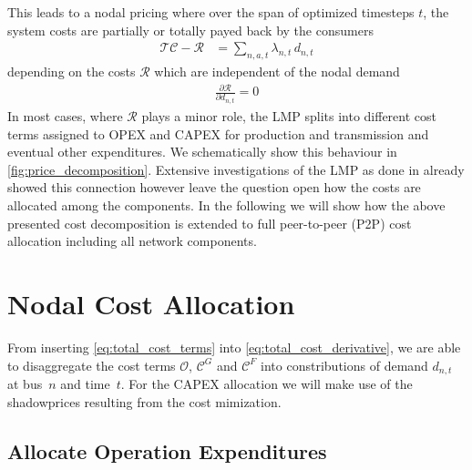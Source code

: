 \documentclass[11pt,twocolumn]{article}
\newcommand{\pdv}[2]{\frac{\partial #1}{\partial #2}}
\newcommand{\demand}[1][n]{d_{#1,t}}
\newcommand{\lmp}[1][n]{\lambda_{#1,t}}
\newcommand{\totalcost}{\mathcal{TC}}
\newcommand{\totalOpexGeneration}{\mathcal{O}}
\newcommand{\totalCapexGeneration}{\mathcal{C}^G}
\newcommand{\totalCapexFlow}{\mathcal{C}^F}
\newcommand{\totalRest}{\mathcal{R}}
\begin{document}
This leads to a nodal pricing where over the span of optimized timesteps $t$, the system costs are partially or totally payed back by the consumers 
\begin{align}
\totalcost - \totalRest &=  \sum_{n,a,t} \lmp \, \demand
\label{eq:total_cost_sum}
\end{align}
depending on the costs $\totalRest$ which are independent of the nodal demand  
\begin{align}
 \pdv{\totalRest}{\demand} = 0
\end{align}
% 
In most cases, where $\totalRest$ plays a minor role, the LMP splits into different cost terms assigned to OPEX and CAPEX for production and transmission and eventual other expenditures. We schematically show this behaviour in \cref{fig:price_decomposition}. 
Extensive investigations of the LMP as done in \cite{schweppe_spot_1988} already showed this connection however leave the question open how the costs are allocated among the components. In the following we will show how the above presented cost decomposition is extended to full peer-to-peer (P2P) cost allocation including all network components. 



\section{Nodal Cost Allocation}
\label{sec:theory}

From inserting \cref{eq:total_cost_terms} into \cref{eq:total_cost_derivative}, we are able to disaggregate the cost terms $\totalOpexGeneration$, $\totalCapexGeneration$ and $\totalCapexFlow$ into constributions of demand $\demand$ at bus~$n$ and time~$t$. For the CAPEX allocation we will make use of the shadowprices resulting from the cost mimization. 


\subsection{Allocate Operation Expenditures}
\end{document}
